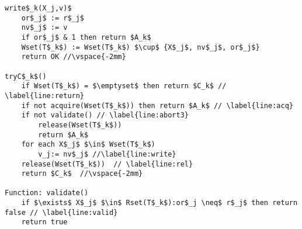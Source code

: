 \begin{algorithm*}[!ht]
\begin{minipage}{0.49\textwidth}
\begin{lstlisting}[frame=none,firstnumber=last,mathescape=true]
write$_k(X_j,v)$
    or$_j$ := r$_j$
    nv$_j$ := v
    if or$_j$ & 1 then return $A_k$
    Wset(T$_k$) := Wset(T$_k$) $\cup$ {X$_j$, nv$_j$, or$_j$}
    return OK //\vspace{-2mm}

tryC$_k$()
    if Wset(T$_k$) = $\emptyset$ then return $C_k$ // \label{line:return}
    if not acquire(Wset(T$_k$)) then return $A_k$ // \label{line:acq}
    if not validate() // \label{line:abort3}
	    release(Wset(T$_k$)) 
	    return $A_k$ 
    for each X$_j$ $\in$ Wset(T$_k$)
	    v_j:= nv$_j$ //\label{line:write}
    release(Wset(T$_k$))  // \label{line:rel}	
    return $C_k$  //\vspace{-2mm}

Function: validate()
    if $\exists$ X$_j$ $\in$ Rset(T$_k$):or$_j \neq$ r$_j$ then return false // \label{line:valid}
    return true

\end{lstlisting}
\end{minipage}
\vspace{-2mm}
\end{algorithm*}




